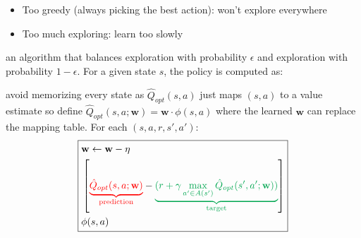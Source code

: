 \begin{itemize}
    \item Too greedy (always picking the best action): won't explore everywhere
    \item Too much exploring: learn too slowly
\end{itemize}

 an algorithm that balances exploration with
probability $\epsilon$ and exploration with probability $1-\epsilon$. For a
given state $s$, the policy is computed as:

 avoid memorizing every state as
$\hat{Q}_{opt}(s,a)$ just maps $(s,a)$ to a value estimate so define
$\hat{Q}_{opt}(s,a; \mathbf{w}) = \mathbf{w} \cdot \phi(s,a)$ where the learned
$\mathbf{w}$ can replace the mapping table.
For each $(s,a,r,s',a')$:
\begin{displaymath}
\boxed{
\begin{aligned}
    &\mathbf{w} \leftarrow \mathbf{w} - \eta \\
    &\left[
        \textcolor{red}{\underbrace{\hat{Q}_{opt}(s,a; \mathbf{w})}_{\text{prediction}}}
        - \textcolor{Green}{\underbrace{(r + \gamma \max_{a' \in A(s')}\hat{Q}_{opt}(s',a'; \mathbf{w}))}_{\text{target}}}
    \right] \\
    &\phi(s,a)
\end{aligned}
}
\end{displaymath}